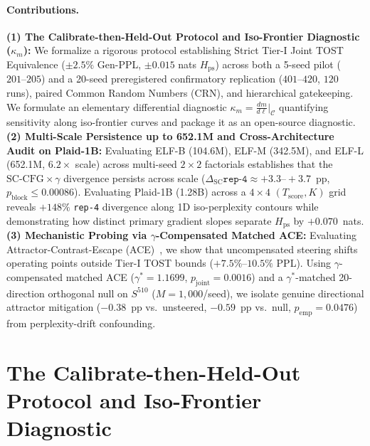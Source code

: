 \documentclass[11pt,a4paper]{article}
\begin{document}
\paragraph{Contributions.}
\textbf{(1) The Calibrate-then-Held-Out Protocol and Iso-Frontier Diagnostic ($\kappa_m$):} We formalize a rigorous protocol establishing Strict Tier-I Joint TOST Equivalence ($\pm 2.5\%$ Gen-PPL, $\pm 0.015$ nats $H_{\mathrm{ps}}$) across both a 5-seed pilot ($201\text{--}205$) and a 20-seed preregistered confirmatory replication ($401\text{--}420$, $120$ runs), paired Common Random Numbers (CRN), and hierarchical gatekeeping. We formulate an elementary differential diagnostic $\kappa_m = \frac{dm}{d\ell}\big|_{\mathcal{C}}$ quantifying sensitivity along iso-frontier curves and package it as an open-source diagnostic.
\textbf{(2) Multi-Scale Persistence up to 652.1M and Cross-Architecture Audit on Plaid-1B:} Evaluating ELF-B (104.6M), ELF-M (342.5M), and ELF-L (652.1M, $6.2\times$ scale) across multi-seed $2\times 2$ factorials establishes that the $\text{SC-CFG} \times \gamma$ divergence persists across scale ($\Delta_{\mathrm{SC}}\texttt{rep-4} \approx +3.3\text{--}+3.7$~pp, $p_{\mathrm{block}} \le 0.00086$). Evaluating Plaid-1B (1.28B) across a $4\times 4$ $(T_{\mathrm{score}}, K)$ grid reveals $+148\%$ \texttt{rep-4} divergence along 1D iso-perplexity contours while demonstrating how distinct primary gradient slopes separate $H_{\mathrm{ps}}$ by $+0.070$~nats.
\textbf{(3) Mechanistic Probing via $\gamma$-Compensated Matched ACE:} Evaluating Attractor-Contrast-Escape (ACE)~\citep{zhang2026selfcond}, we show that uncompensated steering shifts operating points outside Tier-I TOST bounds ($+7.5\%\text{--}10.5\%$ PPL). Using $\gamma$-compensated matched ACE ($\gamma^*=1.1699$, $p_{\mathrm{joint}}=0.0016$) and a $\gamma^*$-matched 20-direction orthogonal null on $S^{510}$ ($M=1{,}000$/seed), we isolate genuine directional attractor mitigation ($-0.38$~pp vs.\ unsteered, $-0.59$~pp vs.\ null, $p_{\mathrm{emp}}=0.0476$) from perplexity-drift confounding.

\section{The Calibrate-then-Held-Out Protocol and Iso-Frontier Diagnostic}
\label{sec:protocol}
\end{document}
